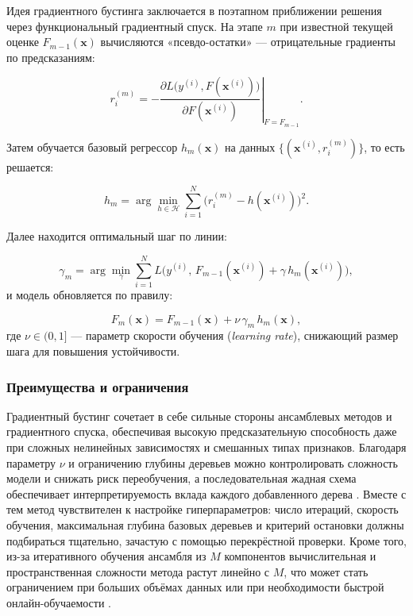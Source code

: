 Идея градиентного бустинга заключается в поэтапном приближении решения через функциональный градиентный спуск. На этапе $m$ при известной текущей оценке $F_{m-1}(\mathbf{x})$ вычисляются «псевдо-остатки» --- отрицательные градиенты по предсказаниям:

\begin{equation}
r_i^{(m)} = -\left.\frac{\partial L\bigl(y^{(i)},F(\mathbf{x}^{(i)})\bigr)}{\partial F(\mathbf{x}^{(i)})}\right|_{F=F_{m-1}}.
\end{equation}

Затем обучается базовый регрессор $h_m(\mathbf{x})$ на данных $\{(\mathbf{x}^{(i)},r_i^{(m)})\}$, то есть решается:

\begin{equation}
h_m = \arg\min_{h\in\mathcal{H}} \sum_{i=1}^N \bigl(r_i^{(m)} - h(\mathbf{x}^{(i)})\bigr)^2.
\end{equation}

Далее находится оптимальный шаг по линии:

\begin{equation}
\gamma_m = \arg\min_{\gamma} \sum_{i=1}^N L\bigl(y^{(i)},\,F_{m-1}(\mathbf{x}^{(i)}) + \gamma\,h_m(\mathbf{x}^{(i)})\bigr),
\end{equation}
и модель обновляется по правилу:

\begin{equation}
F_m(\mathbf{x}) = F_{m-1}(\mathbf{x}) + \nu\,\gamma_m\,h_m(\mathbf{x}),
\end{equation}
где $\nu \in (0,1]$ — параметр скорости обучения (\textit{learning rate}), снижающий размер шага для повышения устойчивости.

\subsubsection{Преимущества и ограничения}

Градиентный бустинг сочетает в себе сильные стороны ансамблевых методов и градиентного спуска, обеспечивая высокую предсказательную способность даже при сложных нелинейных зависимостях и смешанных типах признаков. Благодаря параметру  $\nu$ и ограничению глубины деревьев можно контролировать сложность модели и снижать риск переобучения, а последовательная жадная схема обеспечивает интерпретируемость вклада каждого добавленного дерева \cite{hastie2009elements}. Вместе с тем метод чувствителен к настройке гиперпараметров: число итераций, скорость обучения, максимальная глубина базовых деревьев и критерий остановки должны подбираться тщательно, зачастую с помощью перекрёстной проверки. Кроме того, из-за итеративного обучения ансамбля из $M$ компонентов вычислительная и пространственная сложности метода растут линейно с $M$, что может стать ограничением при больших объёмах данных или при необходимости быстрой онлайн-обучаемости \cite{hastie2009elements}.

